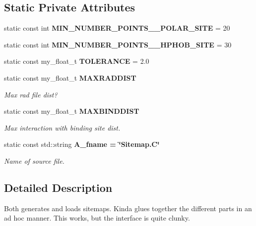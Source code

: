 \subsection*{Static Private Attributes}
\begin{CompactItemize}
\item 
static const int \textbf{MIN\_\-NUMBER\_\-POINTS\_\-\_\-POLAR\_\-SITE} = 20\label{classSimSite3D_1_1Sitemap_693e69f1d3787c869c7510692bcd0e91}

\item 
static const int \textbf{MIN\_\-NUMBER\_\-POINTS\_\-\_\-HPHOB\_\-SITE} = 30\label{classSimSite3D_1_1Sitemap_fd1fc07d472e969eb867e04bbe1170e6}

\item 
static const my\_\-float\_\-t \textbf{TOLERANCE} = 2.0\label{classSimSite3D_1_1Sitemap_872ebaa52aa3fdf3501804dd35077f84}

\item 
static const my\_\-float\_\-t \bf{MAXRADDIST}\label{classSimSite3D_1_1Sitemap_5eeb7fdc83ae79798995a668a58b42e1}

\begin{CompactList}\small\item\em Max rad file dist? \item\end{CompactList}\item 
static const my\_\-float\_\-t \bf{MAXBINDDIST}\label{classSimSite3D_1_1Sitemap_7cf5dd107e339908dc8ca026eba23360}

\begin{CompactList}\small\item\em Max interaction with binding site dist. \item\end{CompactList}\item 
static const std::string \bf{A\_\-fname} = \char`\"{}Sitemap.C\char`\"{}\label{classSimSite3D_1_1Sitemap_b28ac13500885c7b52d35446d3fa89de}

\begin{CompactList}\small\item\em Name of source file. \item\end{CompactList}\end{CompactItemize}


\subsection{Detailed Description}
Both generates and loads sitemaps. Kinda glues together the different parts in an ad hoc manner. This works, but the interface is quite clunky. 



